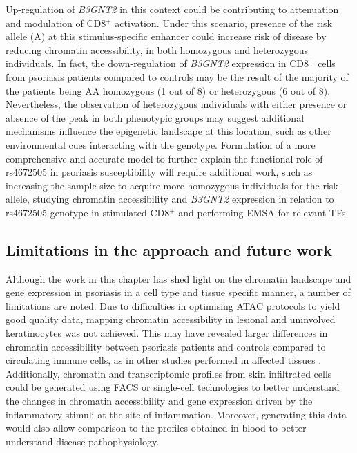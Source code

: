 Up-regulation of \textit{B3GNT2} in this context could be contributing to attenuation and modulation of CD8$^+$ activation. Under this scenario, presence of the risk allele (A) at this stimulus-specific enhancer could increase risk of disease by reducing chromatin accessibility, in both homozygous and heterozygous individuals. In fact, the down-regulation of \textit{B3GNT2} expression in CD8$^+$ cells from psoriasis patients compared to controls may be the result of the majority of the patients being AA homozygous (1 out of 8) or heterozygous (6 out of 8).  Nevertheless, the observation of heterozygous individuals with either presence or absence of the peak in both phenotypic groups may suggest additional mechanisms influence the epigenetic landscape at this location, such as other environmental cues interacting with the genotype. Formulation of a more comprehensive and accurate model to further explain the functional role of rs4672505 in psoriasis susceptibility will require additional work, such as increasing the sample size to acquire more homozygous individuals for the risk allele, studying chromatin accessibility and \textit{B3GNT2} expression in relation to rs4672505 genotype in stimulated CD8$^+$ and performing EMSA for relevant TFs.


\subsection{Limitations in the approach and future work}
Although the work in this chapter has shed light on the chromatin landscape and gene expression in psoriasis in a cell type and tissue specific manner, a number of limitations are noted.  Due to difficulties in optimising ATAC protocols to yield good quality data, mapping chromatin accessibility in lesional and uninvolved keratinocytes was not achieved. This may have revealed larger differences in chromatin accessibility between psoriasis patients and controls compared to circulating immune cells, as in other studies performed in affected tissues \parencite{Scharer2016, Wang2018}. Additionally, chromatin and transcriptomic profiles from skin infiltrated cells could be generated using FACS or single-cell technologies to better understand the changes in chromatin accessibility and gene expression driven by the inflammatory stimuli at the site of inflammation. Moreover, generating this data would also allow comparison to the profiles obtained in blood to better understand disease pathophysiology. 


